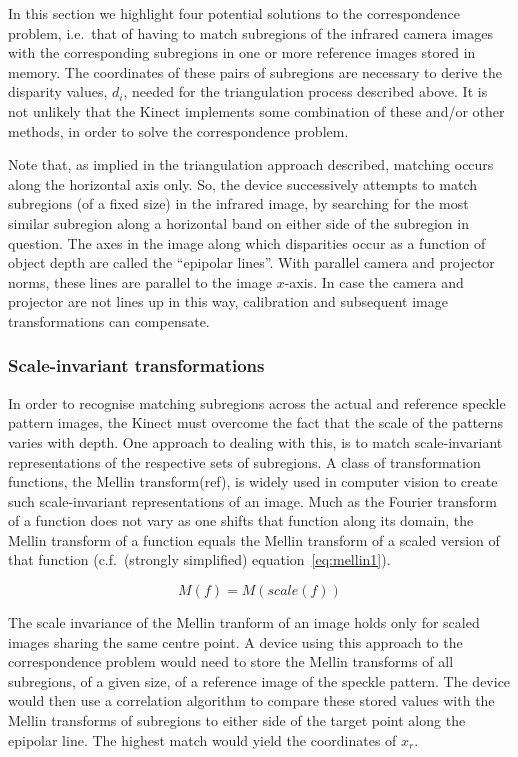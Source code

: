 In this section we highlight four potential solutions to the correspondence
problem, i.e.\ that of having to match subregions of the infrared camera images
with the corresponding subregions in one or more reference images stored in
memory. The coordinates of these pairs of subregions are necessary to derive
the disparity values, $d_i$, needed for the triangulation process described
above.  It is not unlikely that the Kinect implements some combination of these
and/or other methods, in order to solve the correspondence problem.

Note that, as implied in the triangulation approach described, matching occurs
along the horizontal axis only. So, the device successively attempts to match
subregions (of a fixed size) in the infrared image, by searching for the most
similar subregion along a horizontal band on either side of the subregion in
question. The axes in the image along which disparities occur as a function of
object depth are called the ``epipolar lines''. With parallel camera and
projector norms, these lines are parallel to the image $x$-axis. In case the
camera and projector are not lines up in this way, calibration and subsequent
image transformations can compensate.


\subsubsection{Scale-invariant transformations}

In order to recognise matching subregions across the actual and reference
speckle pattern images, the Kinect must overcome the fact that the scale of the
patterns varies with depth. One approach to dealing with this, is to match
scale-invariant representations of the respective sets of subregions. A class of
transformation functions, the Mellin transform(ref), is widely used in computer
vision to create such scale-invariant representations of an image. Much as the
Fourier transform of a function does not vary as one shifts that function along
its domain, the Mellin transform of a function equals the Mellin transform of a
scaled version of that function (c.f.\ (strongly simplified)
equation~\ref{eq:mellin1}).

\begin{equation} \label{eq:mellin1}
    M (f) = M(scale(f))
\end{equation}

The scale invariance of the Mellin tranform of an image holds only for scaled
images sharing the same centre point. A device using this approach to the
correspondence problem would need to store the Mellin transforms of all
subregions, of a given size, of a reference image of the speckle pattern. The
device would then use a correlation algorithm to compare these stored values
with the Mellin transforms of subregions to either side of the target point
along the epipolar line. The highest match would yield the coordinates of $x_r$.


